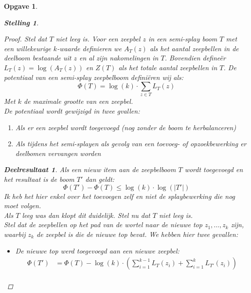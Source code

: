 \documentclass[12pt,hidelinks]{article}
\newtheorem{opgave}{Opgave}
\newtheorem{stelling}{Stelling}
\newtheorem{deelresultaat}{Deelresultaat}
\newcommand{\newln}{~\\\vspace{0.5em}}
\begin{document}
\begin{opgave}
\begin{description}
\begin{stelling}
\begin{proof}
                        Stel dat $T$ niet leeg is. 
                        Voor een zeepbel $z$ in een semi-splay boom $T$ met een willekeurige $k$-waarde definieren we $A_T(z)$ als het aantal zeepbellen in de deelboom bestaande uit
                        $z$ en al zijn nakomelingen in $T$. Bovendien defineër $L_T(z) = \log(A_T(z))$ en $Z(T)$ als het totale aantal zeepbellen in $T$.
                        De potentiaal van een semi-splay zeepbelboom definiëren wij als:
                        \begin{equation}
                            \Phi(T) = \log(k)\cdot\sum _{z\in T}{L_T(z)}
                        \end{equation}
                        Met $k$ de maximale grootte van een zeepbel.
                        \newln
                        De potentiaal wordt gewijzigd in twee gvallen:
                        \begin{enumerate}[1.]
                            \item Als er een zeepbel wordt toegevoegd (nog zonder de boom te herbalanceren)
                            \item Als tijdens het semi-splayen als gevolg van een toevoeg- of opzoekbewerking er deelbomen vervangen worden
                        \end{enumerate}
                        \begin{deelresultaat}
                            Als een nieuw item aan de zeepbelboom $T$ wordt toegevoegd en het resultaat is de boom $T'$ dan geldt: $$\Phi(T')-\Phi(T)\le\log(k)\cdot\log(|T'|)$$
                            \normalfont
                            Ik heb het hier enkel over het toevoegen zelf en niet de splaybewerking die nog moet volgen.
                            \newln
                            Als $T$ leeg was dan klopt dit duidelijk. Stel nu dat $T$ niet leeg is.
                            \newln
                            Stel dat de zeepbellen op het pad van de wortel naar de nieuwe top $z_1,\ldots,z_k$ zijn, waarbij $z_k$ de zeepbel is die de nieuwe top bevat.
                            We hebben hier twee gevallen:
                            \begin{itemize}
                                \item De nieuwe top werd toegevoegd aan een nieuwe zeepbel:
                                    \begin{align*}
                                    \Phi(T') &= \Phi(T)-\log(k)\cdot(\sum_{i=1}^{k-1}{L_T(z_i)}+\sum_{i=1}^{k}{L_{T'}(z_i)}) \\

\end{align*}
\end{itemize}
\end{deelresultaat}
\end{proof}
\end{stelling}
\end{description}
\end{opgave}
\end{document}
